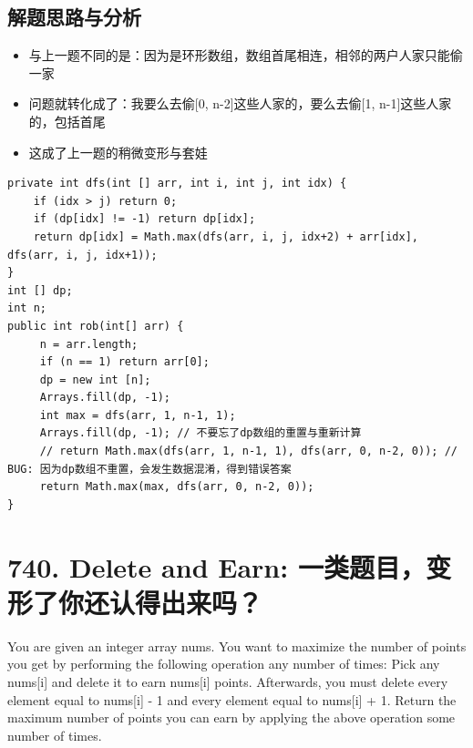 \documentclass[9pt, b5paaper]{book}
\begin{document}
\subsection{解题思路与分析}
\label{sec-2-3-1}
\begin{itemize}
\item 与上一题不同的是：因为是环形数组，数组首尾相连，相邻的两户人家只能偷一家
\item 问题就转化成了：我要么去偷[0, n-2]这些人家的，要么去偷[1, n-1]这些人家的，包括首尾
\item 这成了上一题的稍微变形与套娃
\end{itemize}
\begin{verbatim}
private int dfs(int [] arr, int i, int j, int idx) {
    if (idx > j) return 0;
    if (dp[idx] != -1) return dp[idx];
    return dp[idx] = Math.max(dfs(arr, i, j, idx+2) + arr[idx], dfs(arr, i, j, idx+1));
}
int [] dp;
int n;
public int rob(int[] arr) {
     n = arr.length;
     if (n == 1) return arr[0];
     dp = new int [n];
     Arrays.fill(dp, -1);
     int max = dfs(arr, 1, n-1, 1);
     Arrays.fill(dp, -1); // 不要忘了dp数组的重置与重新计算
     // return Math.max(dfs(arr, 1, n-1, 1), dfs(arr, 0, n-2, 0)); // BUG: 因为dp数组不重置，会发生数据混淆，得到错误答案
     return Math.max(max, dfs(arr, 0, n-2, 0));
}
\end{verbatim}
\section{740. Delete and Earn: 一类题目，变形了你还认得出来吗？}
\label{sec-2-4}
You are given an integer array nums. You want to maximize the number of points you get by performing the following operation any number of times:
Pick any nums[i] and delete it to earn nums[i] points. Afterwards, you must delete every element equal to nums[i] - 1 and every element equal to nums[i] + 1.
Return the maximum number of points you can earn by applying the above operation some number of times.
\end{document}
